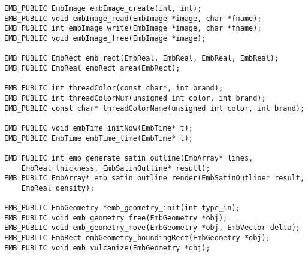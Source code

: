 \begin{verbatim}
EMB_PUBLIC EmbImage embImage_create(int, int);
EMB_PUBLIC void embImage_read(EmbImage *image, char *fname);
EMB_PUBLIC int embImage_write(EmbImage *image, char *fname);
EMB_PUBLIC void embImage_free(EmbImage *image);

EMB_PUBLIC EmbRect emb_rect(EmbReal, EmbReal, EmbReal, EmbReal);
EMB_PUBLIC EmbReal embRect_area(EmbRect);

EMB_PUBLIC int threadColor(const char*, int brand);
EMB_PUBLIC int threadColorNum(unsigned int color, int brand);
EMB_PUBLIC const char* threadColorName(unsigned int color, int brand);

EMB_PUBLIC void embTime_initNow(EmbTime* t);
EMB_PUBLIC EmbTime embTime_time(EmbTime* t);

EMB_PUBLIC int emb_generate_satin_outline(EmbArray* lines,
    EmbReal thickness, EmbSatinOutline* result);
EMB_PUBLIC EmbArray* emb_satin_outline_render(EmbSatinOutline* result,
    EmbReal density);

EMB_PUBLIC EmbGeometry *emb_geometry_init(int type_in);
EMB_PUBLIC void emb_geometry_free(EmbGeometry *obj);
EMB_PUBLIC void emb_geometry_move(EmbGeometry *obj, EmbVector delta);
EMB_PUBLIC EmbRect embGeometry_boundingRect(EmbGeometry *obj);
EMB_PUBLIC void emb_vulcanize(EmbGeometry *obj);


\end{verbatim}

